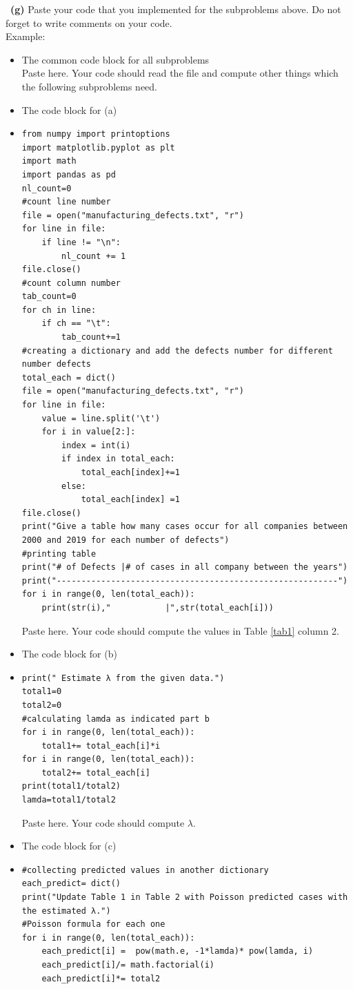 \documentclass[a4 paper]{article}
\numberwithin{equation}{section}
\newcommand{\subproblem}[1]{~\newline\textbf{(#1)}}
\newcommand{\0}{\mathbf{0}}
\begin{document}
	\subproblem{g} Paste your code that you implemented for the subproblems above. Do not forget to write comments on your code.\\
	Example:\\
	\begin{itemize}
		\item The common code block for all subproblems\\
		Paste here. Your code should read the file and compute other things which the following subproblems need.
		\item The code block for (a)\\
		\item{
		  \begin{lstlisting}
from numpy import printoptions
import matplotlib.pyplot as plt
import math
import pandas as pd
nl_count=0
#count line number
file = open("manufacturing_defects.txt", "r")
for line in file:
    if line != "\n":
        nl_count += 1
file.close()
#count column number
tab_count=0
for ch in line:
    if ch == "\t":
        tab_count+=1
#creating a dictionary and add the defects number for different number defects
total_each = dict()
file = open("manufacturing_defects.txt", "r")
for line in file:
    value = line.split('\t')
    for i in value[2:]:
        index = int(i)
        if index in total_each:
            total_each[index]+=1
        else:
            total_each[index] =1
file.close()
print("Give a table how many cases occur for all companies between 2000 and 2019 for each number of defects")
#printing table
print("# of Defects |# of cases in all company between the years")
print("---------------------------------------------------------")
for i in range(0, len(total_each)):
    print(str(i),"           |",str(total_each[i]))
		  \end{lstlisting}
		  }
		Paste here. Your code should compute the values in Table \ref{tab1} column 2.
		\item The code block for (b)\\
		\item{
		  \begin{lstlisting}
print(" Estimate λ from the given data.")
total1=0
total2=0
#calculating lamda as indicated part b
for i in range(0, len(total_each)):
    total1+= total_each[i]*i
for i in range(0, len(total_each)):
    total2+= total_each[i]
print(total1/total2)
lamda=total1/total2

		  \end{lstlisting}
		  }
		Paste here. Your code should compute $\lambda$.
		\item The code block for (c)\\
		\item{
		  \begin{lstlisting}
#collecting predicted values in another dictionary
each_predict= dict()
print("Update Table 1 in Table 2 with Poisson predicted cases with the estimated λ.")
#Poisson formula for each one
for i in range(0, len(total_each)):
    each_predict[i] =  pow(math.e, -1*lamda)* pow(lamda, i)
    each_predict[i]/= math.factorial(i)
    each_predict[i]*= total2


\end{lstlisting}}
\end{itemize}
\end{document}
